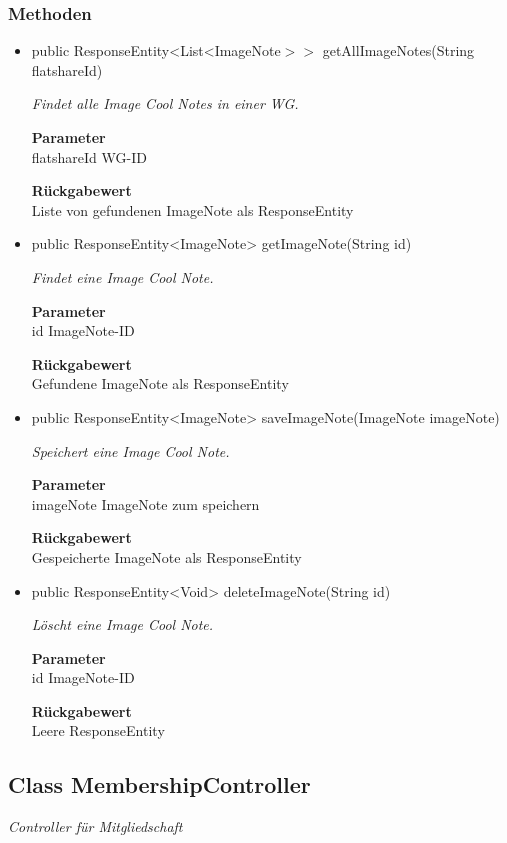 \documentclass[a4paper]{scrreprt}
\begin{document}
        \subsubsection{Methoden}
        \begin{itemize}
        	\item{public ResponseEntity<List<ImageNote$>>$ getAllImageNotes(String flatshareId)}
        	
        	\textit{Findet alle Image Cool Notes in einer WG.}
        	
        	\textbf{Parameter} \\
        	flatshareId WG-ID
        	
        	\textbf{Rückgabewert} \\
        	Liste von gefundenen ImageNote als ResponseEntity        \item{public ResponseEntity<ImageNote> getImageNote(String id)}
        	
        	\textit{Findet eine Image Cool Note.}
        	
        	\textbf{Parameter} \\
        	id ImageNote-ID
        	
        	\textbf{Rückgabewert} \\
        	Gefundene ImageNote als ResponseEntity        \item{public ResponseEntity<ImageNote> saveImageNote(ImageNote imageNote)}
        	
        	\textit{Speichert eine Image Cool Note.}
        	
        	\textbf{Parameter} \\
        	imageNote ImageNote zum speichern
        	
        	\textbf{Rückgabewert} \\
        	Gespeicherte ImageNote als ResponseEntity        \item{public ResponseEntity<Void> deleteImageNote(String id)}
        	
        	\textit{Löscht eine Image Cool Note.}
        	
        	\textbf{Parameter} \\
        	id ImageNote-ID
        	
        	\textbf{Rückgabewert} \\
        	Leere ResponseEntity
        \end{itemize}
        \subsection{Class MembershipController}
        \textit{Controller für Mitgliedschaft}
\end{document}
